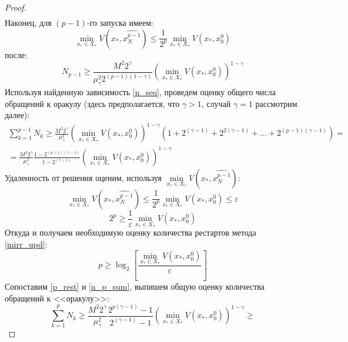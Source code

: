 \begin{proof}
$$\begin{aligned}
       \end{aligned}
       $$
       Наконец, для $(p-1)$-го запуска имеем:
       \begin{equation} \label{v_seq}
           \min\limits_{x_* \in X_*}{V(x_*, \widehat{x_N^{p-1}})} \leq \frac{1}{2^p} \min\limits_{x_* \in X_*}{V(x_*, x_0^0)}
       \end{equation}
       после:
       \begin{equation} \label{n_seq}
           N_{p-1} \geq \frac{M^2 2^{\gamma}}{\mu_{\gamma}^2 2^{(p - 1)(1 - \gamma)}} \left(\min\limits_{x_* \in X_*}{V(x_*, x_0^0)}\right)^{1 - \gamma}
       \end{equation}
       Используя найденную зависимость \eqref{n_seq}, проведем оценку общего числа обращений к оракулу (здесь предполагается, что $\gamma > 1$, случай $\gamma = 1$ рассмотрим далее):
       \begin{equation} \label{n_p_sum}
       \begin{aligned}
           \sum_{k=1}^{p - 1} N_k \geq \frac{M^2 2^{\gamma}}{\mu_{\gamma}^2} \left(\min\limits_{x_* \in X_*}{V(x_*, x_0^0)}\right)^{1 - \gamma} (1 + 2^{(\gamma-1)} + 2^{2(\gamma - 1)} + ... + 2^{(p-1)(\gamma - 1)}) = \\
           = \frac{M^2 2^{\gamma}}{\mu_{\gamma}^2} \frac{1 - 2^{(p-1)(\gamma-1)}}{1 - 2^{(\gamma-1)}} \left(\min\limits_{x_* \in X_*}{V(x_*, x_0^0)}\right)^{1 - \gamma}
       \end{aligned}
       \end{equation}
       Удаленность от решения оценим, используя $\min\limits_{x_* \in X_*}{V(x_*, \widehat{x_N^{p-1}})}$:
       $$
           \min\limits_{x_* \in X_*}{V(x_*, \widehat{x_N^{p-1}})} \leq \frac{1}{2^p} \min\limits_{x_* \in X_*}{V(x_*, x_0^0)} \leq \varepsilon
       $$
       $$
            2^p \geq \frac{1}{\varepsilon} \min\limits_{x_* \in X_*}{V(x_*, x_0^0)}
       $$
       Откуда и получаем необходимую оценку количества рестартов метода \eqref{mirr_upd}:
       \begin{equation} \label{p_rest}
            p \geq \log_2{\left[\frac{\min\limits_{x_* \in X_*}{V(x_*, x_0^0)}}{\varepsilon}\right]}
       \end{equation}
       Сопоставим \eqref{p_rest} и \eqref{n_p_sum}, выпишем общую оценку количества обращений к <<оракулу>>:
       $$
           \sum_{k=1}^{p} N_k \geq \frac{M^2 2^{\gamma}}{\mu_{\gamma}^2} \frac{2^{p(\gamma-1)} - 1}{2^{(\gamma-1)} - 1} \left(\min\limits_{x_* \in X_*}{V(x_*, x_0^0)}\right)^{1 - \gamma} \geq 
       $$
       $$
$$
\end{proof}
